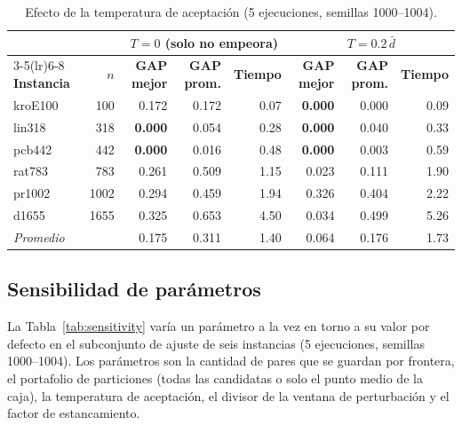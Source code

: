 \documentclass[runningheads]{llncs}
\begin{document}
\begin{table}
\caption{Efecto de la temperatura de aceptación (5 ejecuciones, semillas
1000--1004).}
\label{tab:ablation}
\centering\scriptsize
\begin{tabular}{@{}lrrrrrrr@{}}
\toprule
& & \multicolumn{3}{c}{$T=0$ (solo no empeora)} & \multicolumn{3}{c}{$T=0.2\,\bar d$} \\
\cmidrule(lr){3-5}\cmidrule(lr){6-8}
\textbf{Instancia} & $n$ & \textbf{GAP mejor} & \textbf{GAP prom.} & \textbf{Tiempo} & \textbf{GAP mejor} & \textbf{GAP prom.} & \textbf{Tiempo} \\
\midrule
kroE100 &  100 & 0.172 & 0.172 & 0.07 & \textbf{0.000} & 0.000 & 0.09 \\
lin318  &  318 & \textbf{0.000} & 0.054 & 0.28 & \textbf{0.000} & 0.040 & 0.33 \\
pcb442  &  442 & \textbf{0.000} & 0.016 & 0.48 & \textbf{0.000} & 0.003 & 0.59 \\
rat783  &  783 & 0.261 & 0.509 & 1.15 & 0.023 & 0.111 & 1.90 \\
pr1002  & 1002 & 0.294 & 0.459 & 1.94 & 0.326 & 0.404 & 2.22 \\
d1655   & 1655 & 0.325 & 0.653 & 4.50 & 0.034 & 0.499 & 5.26 \\
\midrule
\textit{Promedio} & & 0.175 & 0.311 & 1.40 & 0.064 & 0.176 & 1.73 \\
\bottomrule
\end{tabular}
\end{table}

\subsection{Sensibilidad de parámetros}
\label{sec:sensitivity}

La Tabla~\ref{tab:sensitivity} varía un parámetro a la vez en torno a su
valor por defecto en el subconjunto de ajuste de seis instancias (5
ejecuciones, semillas 1000--1004). Los parámetros son la cantidad de
pares que se guardan por frontera, el portafolio de particiones (todas
las candidatas o solo el punto medio de la caja), la temperatura de
aceptación, el divisor de la ventana de perturbación y el factor de
estancamiento.
\end{document}
